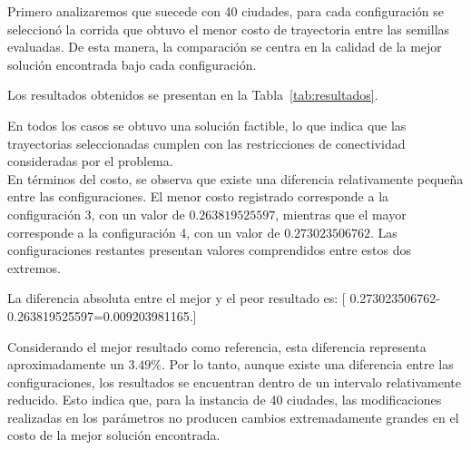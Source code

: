 \documentclass[12pt,a4paper]{article}
\begin{document}
Primero analizaremos que suecede con 40 ciudades, para cada configuración se seleccionó la corrida que obtuvo el menor costo de trayectoria entre las semillas evaluadas. De esta manera, la comparación se centra en la calidad de la mejor solución encontrada bajo cada configuración.

Los resultados obtenidos se presentan en la Tabla~\ref{tab:resultados}.

\begin{table}[H]
    \centering
    \caption{Mejores resultados obtenidos para cada configuración.}
    \label{tab:resultados}
\end{table}

En todos los casos se obtuvo una solución factible, lo que indica que las trayectorias seleccionadas cumplen con las restricciones de conectividad consideradas por el problema.\\
En términos del costo, se observa que existe una diferencia relativamente pequeña entre las configuraciones. El menor costo registrado corresponde a la configuración 3, con un valor de $0.263819525597$, mientras que el mayor corresponde a la configuración 4, con un valor de $0.273023506762$. Las configuraciones restantes presentan valores comprendidos entre estos dos extremos.

La diferencia absoluta entre el mejor y el peor resultado es:
[ 0.273023506762-0.263819525597=0.009203981165.]

Considerando el mejor resultado como referencia, esta diferencia representa aproximadamente un $3.49\%$. Por lo tanto, aunque existe una diferencia entre las configuraciones, los resultados se encuentran dentro de un intervalo relativamente reducido. Esto indica que, para la instancia de 40 ciudades, las modificaciones realizadas en los parámetros no producen cambios extremadamente grandes en el costo de la mejor solución encontrada.
\end{document}
